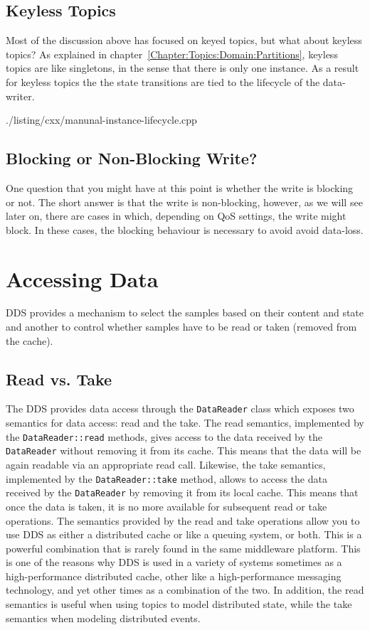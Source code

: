 \subsection{Keyless Topics} 
Most of the discussion above has focused on keyed topics, but what about 
keyless topics? 
As explained in chapter~\ref{Chapter:Topics:Domain:Partitions}, 
keyless topics are like singletons, in the sense that there is only one instance. 
As a result for keyless topics the the state transitions are tied to the 
lifecycle of the data-writer.

		{./listing/cxx/manunal-instance-lifecycle.cpp}
\subsection{Blocking or Non-Blocking Write?}
One question that you might have at this point is whether the write 
is blocking or not. The short answer is that the write is non-blocking, 
however, as we will see later on, there are cases 
in which, depending on \ac{QoS} settings, the write might block. 
In these cases, the blocking behaviour is necessary to avoid 
avoid data-loss. 


\section{Accessing Data}
\ac{DDS} provides a mechanism to select the samples based 
on their content and state and another to control whether 
samples have to be read or taken (removed from the cache). 

\subsection{Read vs. Take}
The \ac{DDS} provides data access through the \texttt{DataReader} class which 
exposes two semantics for data access: read and the take.
The read semantics, implemented by the \texttt{DataReader::read} methods, 
gives access to the data received by the \texttt{DataReader} without removing 
it from its cache. This means that the data will be again readable 
via an appropriate read call. Likewise, the  take 
semantics, implemented by the \texttt{DataReader::take} method, 
allows to access the data received by the \texttt{DataReader} by removing 
it from its local cache. This means that once the data is taken, it is 
no more available for subsequent read or take operations.
The semantics provided by the  read and take operations allow you to 
use \ac{DDS} as either a distributed cache or like a queuing system, or both.
This is a powerful combination that is rarely found in the same middleware platform. 
This is one of the reasons why \ac{DDS} is used in a variety of systems 
sometimes as a high-performance distributed cache, other like a high-performance 
messaging technology, and yet other times as a combination of the two. 
In addition, the read semantics is useful when using topics to model 
distributed state, while the take semantics when modeling distributed events.

